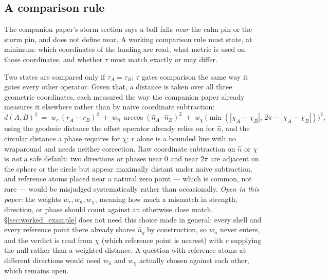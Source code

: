 \documentclass[12pt, a4paper]{article}
\begin{document}
\subsection{A comparison rule}
\label{subsec:comparison_rule}
The companion paper's storm section says a ball falls \emph{near} the
$\mathrm{calm}$ pin or the $\mathrm{storm}$ pin, and does not define
near. A working comparison rule must state, at minimum: which
coordinates of the landing are read, what metric is used on those
coordinates, and whether $\tau$ must match exactly or may differ.

Two states are compared only if $\tau_A=\tau_B$; $\tau$ gates
comparison the same way it gates every other operator. Given that, a
distance is taken over all three geometric coordinates, each measured
the way the companion paper already measures it elsewhere rather than
by naive coordinate subtraction:
\begin{equation}
    d(A,B)^2 \;=\;
    w_r\,(r_A-r_B)^2
    \;+\;
    w_{\hat n}\,\arccos(\hat n_A\cdot\hat n_B)^2
    \;+\;
    w_\chi\,\bigl(\min(|\chi_A-\chi_B|,\,2\pi-|\chi_A-\chi_B|)\bigr)^2 ,
    \label{eq:comparison_metric}
\end{equation}
using the geodesic distance the offset operator already relies on for
$\hat n$, and the circular distance a phase requires for $\chi$; $r$
alone is a bounded line with no wraparound and needs neither
correction. Raw coordinate subtraction on $\hat n$ or $\chi$ is
\emph{not} a safe default: two directions or phases near $0$ and near
$2\pi$ are adjacent on the sphere or the circle but appear maximally
distant under naive subtraction, and reference atoms placed near a
natural zero point --- which is common, not rare --- would be
misjudged systematically rather than occasionally. \emph{Open in this
paper:} the weights $w_r,w_{\hat n},w_\chi$, meaning how much a
mismatch in strength, direction, or phase should count against an
otherwise close match. \S\ref{sec:worked_example} does not need this
choice made in general: every shell and every reference point there
already shares $\hat n_q$ by construction, so $w_{\hat n}$ never
enters, and the verdict is read from $\chi$ (which reference point is
nearest) with $r$ supplying the null rather than a weighted distance.
A question with reference atoms at different directions would need
$w_{\hat n}$ and $w_\chi$ actually chosen against each other, which
remains open.
\end{document}
